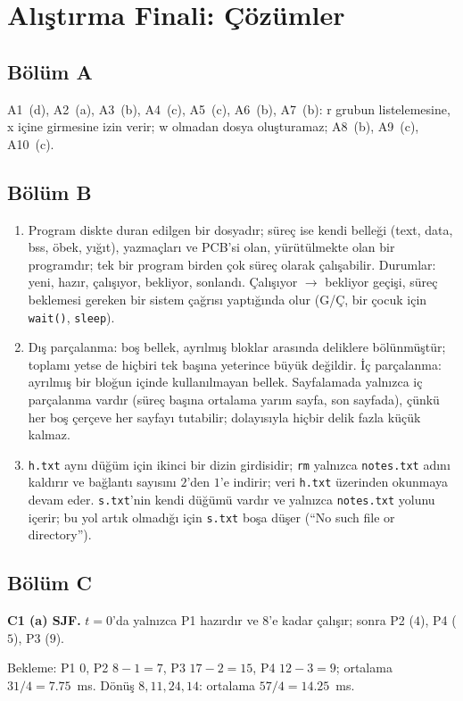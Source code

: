 \documentclass[11pt,a4paper]{article}
\newcommand{\cmd}[1]{\texttt{#1}}
\begin{document}
\section{Alıştırma Finali: Çözümler}
\label{sec:pfsol}

\subsection*{Bölüm A}
A1~(d), A2~(a), A3~(b), A4~(c), A5~(c), A6~(b), A7~(b): r grubun listelemesine, x içine girmesine izin verir; w olmadan dosya oluşturamaz; A8~(b), A9~(c), A10~(c).

\subsection*{Bölüm B}
\begin{enumerate}[leftmargin=1.6em,label=B\arabic*.]
  \item Program diskte duran edilgen bir dosyadır; süreç ise kendi belleği (text, data, bss, öbek, yığıt), yazmaçları ve PCB'si olan, yürütülmekte olan bir programdır; tek bir program birden çok süreç olarak çalışabilir. Durumlar: yeni, hazır, çalışıyor, bekliyor, sonlandı. Çalışıyor $\to$ bekliyor geçişi, süreç beklemesi gereken bir sistem çağrısı yaptığında olur (G/Ç, bir çocuk için \cmd{wait()}, \cmd{sleep}).
  \item Dış parçalanma: boş bellek, ayrılmış bloklar arasında deliklere bölünmüştür; toplamı yetse de hiçbiri tek başına yeterince büyük değildir. İç parçalanma: ayrılmış bir bloğun içinde kullanılmayan bellek. Sayfalamada yalnızca iç parçalanma vardır (süreç başına ortalama yarım sayfa, son sayfada), çünkü her boş çerçeve her sayfayı tutabilir; dolayısıyla hiçbir delik fazla küçük kalmaz.
  \item \texttt{h.txt} aynı düğüm için ikinci bir dizin girdisidir; \cmd{rm} yalnızca \texttt{notes.txt} adını kaldırır ve bağlantı sayısını $2$'den $1$'e indirir; veri \texttt{h.txt} üzerinden okunmaya devam eder. \texttt{s.txt}'nin kendi düğümü vardır ve yalnızca \texttt{notes.txt} yolunu içerir; bu yol artık olmadığı için \texttt{s.txt} boşa düşer (``No such file or directory'').
\end{enumerate}

\subsection*{Bölüm C}
\textbf{C1 (a) SJF.} $t=0$'da yalnızca P1 hazırdır ve $8$'e kadar çalışır; sonra P2 ($4$), P4 ($5$), P3 ($9$).
\begin{center}\end{center}
Bekleme: P1 $0$, P2 $8-1 = 7$, P3 $17-2 = 15$, P4 $12-3 = 9$; ortalama $31/4 = 7.75$~ms. Dönüş $8, 11, 24, 14$: ortalama $57/4 = 14.25$~ms.
\end{document}

